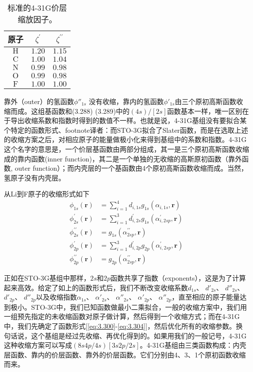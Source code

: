 \begin{table}[]
    \centering
    \begin{tabular}{ccc}
    \toprule 
    原子         & $\zeta^{\prime}$ & $\zeta^{\prime \prime}$ \\
    \midrule 
    $\mathrm{H}$ & $1.20$ & $1.15$ \\
    $\mathrm{C}$ & $1.00$ & $1.04$ \\
    $\mathrm{N}$ & $0.99$ & $0.98$ \\
    $\mathrm{O}$ & $0.99$ & $0.98$ \\
    $\mathrm{F}$ & $1.00$ & $1.00$ \\
    \bottomrule
    \end{tabular}
    \caption{标准的4-31G价层缩放因子。}
    \label{tab:3.9}
\end{table}

靠外（outer）的氢函数$\phi''_{1s}$ 没有收缩，靠内的氢函数$\phi'_{1s}$由三个原初高斯函数收缩而成。这组基函数和(3.288) (3.289)中的$(4s)/[2s]$函数基本一样，唯一区别在于导出收缩系数和指数时得到的数值不一样。也就是说，4-31G基组没有要拟合某个特定的函数形式、footnote{译者：而STO-3G拟合了Slater函数}，而是在选取上述的收缩方案之后，对相应原子的能量做极小化来得到基组中的系数和指数。4-31G这个名字的意思是，一个价层基函数由两部分组成，其一是三个原初高斯函数收缩成的靠内函数(inner function)，其二是一个单独的无收缩的高斯原初函数（靠外函数, outer function）；而内壳层的一个基函数由4个原初高斯函数收缩而成。当然，氢原子没有内壳层。

从Li到F原子的收缩形式如下
\begin{align}
\phi_{1 s}(\mathbf{r}) & = \sum_{i=1}^4 d_{i, 1 s} g_{1 s}\left(\alpha_{i, 1 s}, \mathbf{r}\right) 
\label{eq:3.300}
\\
\phi_{2 s}^{\prime}(\mathbf{r}) & = \sum_{i=1}^3 d_{i, 2 s}^{\prime} g_{1 s}\left(\alpha_{i, 2 s p}^{\prime}, \mathbf{r}\right) \\
\phi_{2 s}^{\prime \prime}(\mathbf{r}) & = g_{1 s}\left(\alpha_{2 s p}^{\prime \prime}, \mathbf{r}\right) \\
\phi_{2 p}^{\prime}(\mathbf{r}) & = \sum_{i=1}^3 d_{i, 2 p}^{\prime} g_{2 p}\left(\alpha_{i, 2 s p}^{\prime}, \mathbf{r}\right) \\
\phi_{2 p}^{\prime \prime}(\mathbf{r}) & = g_{2 p}\left(\alpha_{2 s p}^{\prime \prime}, \mathbf{r}\right)
\label{eq:3.300}
\end{align}

正如在STO-3G基组中那样，$2s$和$2p$函数共享了指数（exponents），这是为了计算起来高效。给定了如上的函数形式后，我们不断改变收缩系数$d_{1s}$、 $d'_{2s}$、 $d''_{2s}$、 $d'_{2p}$、 $d''_{2p}$以及收缩指数$\alpha_{1s}$、 $\alpha'_{2s}$、 $\alpha''_{2s}$、 $\alpha'_{2p}$、 $\alpha''_{2p}$，直至相应的原子能量达到极小。STO-3G中，我们已知函数做最小二乘拟合，一般的收缩方案中，我们用一组预先指定的未收缩函数对原子做计算，然后得到一个收缩方式；而在4-31G中，我们先确定了函数形式[\eqref{eq:3.300}-\eqref{eq:3.304}]，然后优化所有的收缩参数。换句话说，这个基组是经过先收缩、再优化得到的。如果用我们的一般记号，4-31G这种收缩方案可以写成$(8s4p/4s)[3s2p/2s]$。4-31G基组由三类函数构成：内壳层函数、靠内的价层函数、靠外的价层函数。它们分别由4、3、1个原初函数收缩而来。

